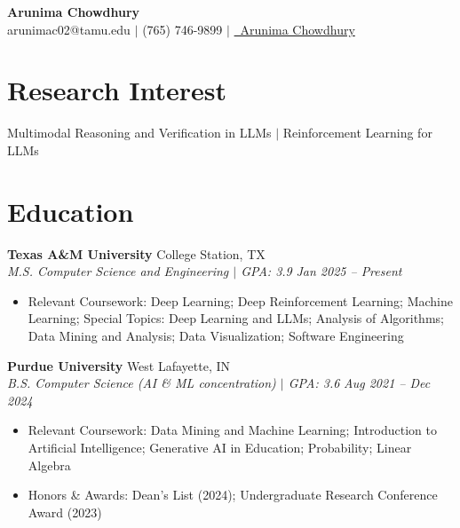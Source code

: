 \documentclass[10pt,letterpaper]{article}
\newcommand{\heading}[4]{%
  \noindent\textbf{#1} \hfill #2\\
  \textit{#3} \hfill \textit{#4}\par
}
\begin{document}

\begin{center}
  {\Large \textbf{Arunima Chowdhury}}\\[2pt]
  arunimac02@tamu.edu $|$ (765) 746-9899 $|$
  \href{https://linkedin.com/in/arunima-chowdhury}{\faLinkedin\ Arunima Chowdhury}
\end{center}
\vspace{-8pt}


\section{Research Interest}
Multimodal Reasoning and Verification in LLMs $|$ Reinforcement Learning for LLMs

\section{Education}

\heading{Texas A\&M University}{College Station, TX}{M.S. Computer Science and Engineering $|$ GPA: 3.9}{Jan 2025 -- Present}
\begin{itemize}
  \item Relevant Coursework: Deep Learning; Deep Reinforcement Learning; Machine Learning; Special Topics: Deep Learning and LLMs; Analysis of Algorithms; Data Mining and Analysis; Data Visualization; Software Engineering
\end{itemize}

\heading{Purdue University}{West Lafayette, IN}{B.S. Computer Science (AI \& ML concentration) $|$ GPA: 3.6}{Aug 2021 -- Dec 2024}
\begin{itemize}
  \item Relevant Coursework: Data Mining and Machine Learning; Introduction to Artificial Intelligence; Generative AI in Education; Probability; Linear Algebra
  \item Honors \& Awards: Dean's List (2024); Undergraduate Research Conference Award (2023)
\end{itemize}
\end{document}

